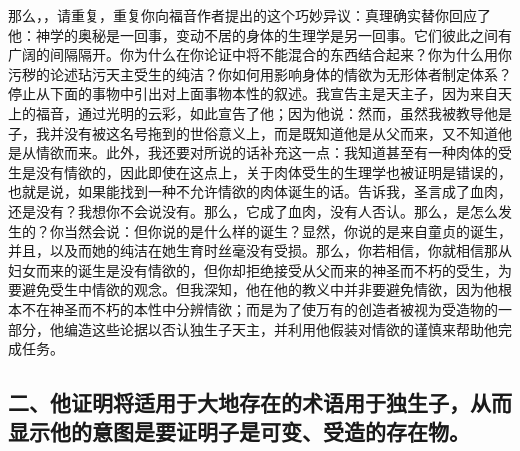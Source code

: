 那么，，请重复，重复你向福音作者提出的这个巧妙异议：真理确实替你回应了他：神学的奥秘是一回事，变动不居的身体的生理学是另一回事。它们彼此之间有广阔的间隔隔开。你为什么在你论证中将不能混合的东西结合起来？你为什么用你污秽的论述玷污天主受生的纯洁？你如何用影响身体的情欲为无形体者制定体系？停止从下面的事物中引出对上面事物本性的叙述。我宣告主是天主子，因为来自天上的福音，通过光明的云彩，如此宣告了他；因为他说：然而，虽然我被教导他是子，我并没有被这名号拖到的世俗意义上，而是既知道他是从父而来，又不知道他是从情欲而来。此外，我还要对所说的话补充这一点：我知道甚至有一种肉体的受生是没有情欲的，因此即使在这点上，关于肉体受生的生理学也被证明是错误的，也就是说，如果能找到一种不允许情欲的肉体诞生的话。告诉我，圣言成了血肉，还是没有？我想你不会说没有。那么，它成了血肉，没有人否认。那么，是怎么发生的？你当然会说：但你说的是什么样的诞生？显然，你说的是来自童贞的诞生，并且，以及而她的纯洁在她生育时丝毫没有受损。那么，你若相信，你就相信那从妇女而来的诞生是没有情欲的，但你却拒绝接受从父而来的神圣而不朽的受生，为要避免受生中情欲的观念。但我深知，他在他的教义中并非要避免情欲，因为他根本不在神圣而不朽的本性中分辨情欲；而是为了使万有的创造者被视为受造物的一部分，他编造这些论据以否认独生子天主，并利用他假装对情欲的谨慎来帮助他完成任务。\par


\subsection{二、他证明将适用于大地存在的术语用于独生子，从而显示他的意图是要证明子是可变、受造的存在物。}

